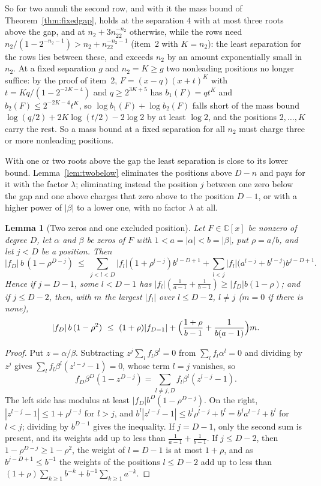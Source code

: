\documentclass[11pt]{article}
\newtheorem{lemma}[theorem]{Lemma}
\begin{document}
So for two annuli the second row, and with it the mass bound of
Theorem~\ref{thm:fixedgap}, holds at the separation $4$ with at most three
roots above the gap, and at $n_2+3n_22^{-n_2}$ otherwise, while the rows
need $n_2/(1-2^{-n_2-1})>n_2+n_22^{-n_2-1}$ (item~2 with $K=n_2$): the
least separation for the rows lies between these, and exceeds $n_2$ by an
amount exponentially small in $n_2$.  At a fixed separation $g$ and $n_2=K\ge g$ two
nonleading positions no longer suffice: by the proof of item~2,
$F=(x-q)(x+t)^K$ with $t=Kq/(1-2^{-2K-4})$ and $q\ge2^{3K+5}$ has
$b_1(F)=qt^K$ and $b_2(F)\le2^{-2K-4}t^K$, so
$\log b_1(F)+\log b_2(F)$ falls short of the mass bound
$\log(q/2)+2K\log(t/2)-2\log2$ by at least $\log2$, and the positions
$2,\ldots,K$ carry the rest.  So a mass bound at a fixed separation for
all $n_2$ must charge three or more nonleading positions.

With one or two roots above the gap the least separation is close to its
lower bound.  Lemma~\ref{lem:twobelow} eliminates the positions above
$D-n$ and pays for it with the factor $\lambda$; eliminating instead the
position $j$ between one zero below the gap and one above charges that zero
above to the position $D-1$, or with a higher power of $|\beta|$ to a lower
one, with no factor $\lambda$ at all.

\begin{lemma}[Two zeros and one excluded position]\label{lem:twozeros}
Let $F\in\mathbb C[x]$ be nonzero of degree $D$, let $\alpha$ and $\beta$ be
zeros of $F$ with $1<a=|\alpha|<b=|\beta|$, put $\rho=a/b$, and let $j<D$
be a position.  Then
\[
  |f_D|\,b\,(1-\rho^{D-j})\ \le\ \sum_{j<l<D}|f_l|(1+\rho^{l-j})b^{l-D+1}
  +\sum_{l<j}|f_l|\bigl(a^{l-j}+b^{l-j}\bigr)b^{j-D+1} .
\]
Hence if $j=D-1$, some $l<D-1$ has
$|f_l|(\frac1{a-1}+\frac1{b-1})\ge|f_D|b(1-\rho)$; and if $j\le D-2$,
then, with $m$ the largest $|f_l|$ over $l\le D-2$, $l\ne j$ ($m=0$ if
there is none),
\[
  |f_D|\,b\,(1-\rho^2)\ \le\ (1+\rho)|f_{D-1}|
  +\Bigl(\frac{1+\rho}{b-1}+\frac1{b(a-1)}\Bigr)m .
\]
\end{lemma}

\begin{proof}
Put $z=\alpha/\beta$.  Subtracting $z^j\sum_lf_l\beta^l=0$ from
$\sum_lf_l\alpha^l=0$ and dividing by $z^j$ gives
$\sum_lf_l\beta^l(z^{l-j}-1)=0$, whose term $l=j$ vanishes, so
\[
  f_D\beta^D(1-z^{D-j})=\sum_{l\ne j,D}f_l\beta^l(z^{l-j}-1).
\]
The left side has modulus at least $|f_D|b^D(1-\rho^{D-j})$.  On the right,
$|z^{l-j}-1|\le1+\rho^{l-j}$ for $l>j$, and
$b^l|z^{l-j}-1|\le b^l\rho^{l-j}+b^l=b^ja^{l-j}+b^l$ for $l<j$; dividing
by $b^{D-1}$ gives the inequality.  If $j=D-1$, only the second sum is
present, and its weights add up to less than $\frac1{a-1}+\frac1{b-1}$.  If
$j\le D-2$, then $1-\rho^{D-j}\ge1-\rho^2$, the weight of $l=D-1$ is at most
$1+\rho$, and as $b^{j-D+1}\le b^{-1}$ the weights of the positions $l\le
D-2$ add up to less than $(1+\rho)\sum_{k\ge1}b^{-k}+b^{-1}\sum_{k\ge1}a^{-k}$.
\end{proof}
\end{document}
